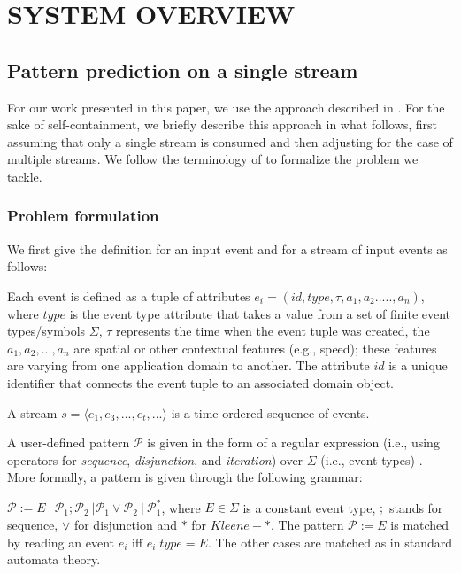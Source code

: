 \section{SYSTEM OVERVIEW}
\label{sec:system}
\subsection{Pattern prediction on a single stream}

For our work presented in this paper,
we use the approach described in \cite{alevizos2017event}.
For the sake of self-containment,
we briefly describe this approach in what follows,
first assuming that only a single stream is consumed
and then adjusting for the case of multiple streams.
We follow the terminology of \cite{luckham2008power,alevizos2015complex,zhou_pattern_2015} to formalize the problem we tackle.

\subsubsection{Problem formulation}

We first give the definition for an input event and for a stream of input events as follows:  
\begin{definition}
	Each event is defined as a tuple of attributes $e_i = (id,type,\tau,a_1,a_2.....,a_n)$, where $type$ is the event type attribute that takes a value from a set of finite event types/symbols $\Sigma$, $\tau$ represents the time when the event tuple was created,  the  $a_1,a_2,...,a_n$ are spatial or other contextual features (e.g., speed); these features are varying from one application domain to another. The attribute $id$ is a unique identifier that connects the event tuple to an associated domain object.
\end{definition}

\begin{definition}
A stream $s=\langle e_1,e_3,...,e_t,...\rangle$  is a time-ordered sequence of events.
\end{definition}

\par A user-defined pattern $\mathcal{P}$ is given in the form of a regular expression (i.e., using operators for \textit{sequence}, \textit{disjunction}, and \textit{iteration}) over $\Sigma$ (i.e., event types) \cite{alevizos2017event}.
More formally, a pattern is given through the following grammar:
\begin{definition}
$\mathcal{P} := E\ |\ \mathcal{P}_{1} ; \mathcal{P}_{2}\ | \mathcal{P}_{1} \vee \mathcal{P}_{2}\ |\ \mathcal{P}_{1}^{*}  $, where $E \in \Sigma$ is a constant event type, $;$ stands for sequence, $\vee$ for disjunction and $*$ for $\mathit{Kleene}-*$.
The pattern $\mathcal{P} := E$ is matched by reading an event $e_i$ iff $e_{i}.type = E$.
The other cases are matched as in standard automata theory.
\end{definition}


